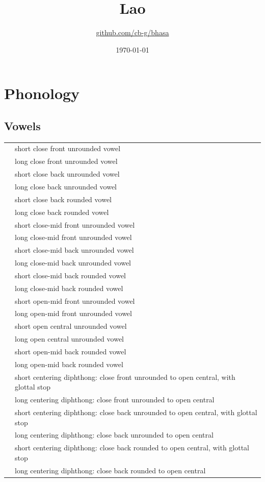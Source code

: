 \documentclass{article}
\title{Lao\\\ipa{[p\super ha:\tone{45}sa:\tone{24}la:w\tone{45}]}}
\author{\href{https://github.com/cb-g/bhasa}{github.com/cb-g/bhasa}}
\date{\today}
\begin{document}
\pagecolor{custom_bg}\color{custom_fg}
\maketitle\thispagestyle{empty}

\newpage\setcounter{page}{1}\section{Phonology}

\subsection{Vowels}

\begin{xltabular}{\textwidth}{lL}
   & short close front unrounded vowel \\
   & long close front unrounded vowel \\
   & short close back unrounded vowel \\
   & long close back unrounded vowel \\
   & short close back rounded vowel \\
   & long close back rounded vowel \\
   & short close-mid front unrounded vowel \\
   & long close-mid front unrounded vowel \\
   & short close-mid back unrounded vowel \\
   & long close-mid back unrounded vowel \\
   & short close-mid back rounded vowel \\
   & long close-mid back rounded vowel \\
   & short open-mid front unrounded vowel \\
   & long open-mid front unrounded vowel \\
   & short open central unrounded vowel \\
   & long open central unrounded vowel \\
   & short open-mid back rounded vowel \\
   & long open-mid back rounded vowel \\
   & short centering diphthong: close front unrounded to open central, with glottal stop \\
   & long centering diphthong: close front unrounded to open central \\
   & short centering diphthong: close back unrounded to open central, with glottal stop \\
   & long centering diphthong: close back unrounded to open central \\
   & short centering diphthong: close back rounded to open central, with glottal stop \\
   & long centering diphthong: close back rounded to open central \\
\end{xltabular}
\end{document}
